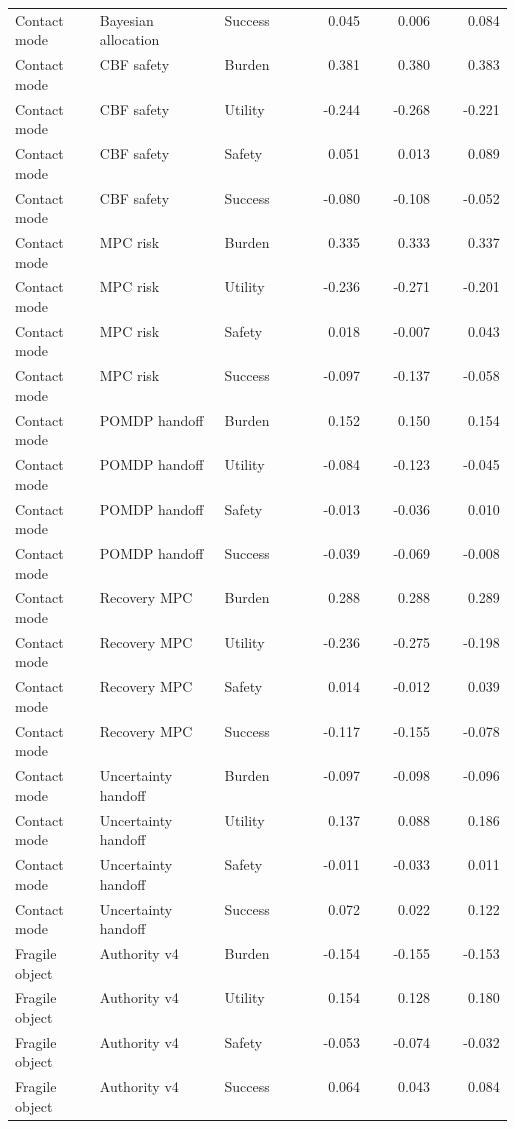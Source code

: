 \documentclass{article}
\begin{document}
\begin{center}
\begin{longtable}{p{0.17\linewidth}p{0.25\linewidth}p{0.16\linewidth}rrr}
Contact mode & Bayesian allocation & Success & 0.045 & 0.006 & 0.084\\
Contact mode & CBF safety & Burden & 0.381 & 0.380 & 0.383\\
Contact mode & CBF safety & Utility & -0.244 & -0.268 & -0.221\\
Contact mode & CBF safety & Safety & 0.051 & 0.013 & 0.089\\
Contact mode & CBF safety & Success & -0.080 & -0.108 & -0.052\\
Contact mode & MPC risk & Burden & 0.335 & 0.333 & 0.337\\
Contact mode & MPC risk & Utility & -0.236 & -0.271 & -0.201\\
Contact mode & MPC risk & Safety & 0.018 & -0.007 & 0.043\\
Contact mode & MPC risk & Success & -0.097 & -0.137 & -0.058\\
Contact mode & POMDP handoff & Burden & 0.152 & 0.150 & 0.154\\
Contact mode & POMDP handoff & Utility & -0.084 & -0.123 & -0.045\\
Contact mode & POMDP handoff & Safety & -0.013 & -0.036 & 0.010\\
Contact mode & POMDP handoff & Success & -0.039 & -0.069 & -0.008\\
Contact mode & Recovery MPC & Burden & 0.288 & 0.288 & 0.289\\
Contact mode & Recovery MPC & Utility & -0.236 & -0.275 & -0.198\\
Contact mode & Recovery MPC & Safety & 0.014 & -0.012 & 0.039\\
Contact mode & Recovery MPC & Success & -0.117 & -0.155 & -0.078\\
Contact mode & Uncertainty handoff & Burden & -0.097 & -0.098 & -0.096\\
Contact mode & Uncertainty handoff & Utility & 0.137 & 0.088 & 0.186\\
Contact mode & Uncertainty handoff & Safety & -0.011 & -0.033 & 0.011\\
Contact mode & Uncertainty handoff & Success & 0.072 & 0.022 & 0.122\\
Fragile object & Authority v4 & Burden & -0.154 & -0.155 & -0.153\\
Fragile object & Authority v4 & Utility & 0.154 & 0.128 & 0.180\\
Fragile object & Authority v4 & Safety & -0.053 & -0.074 & -0.032\\
Fragile object & Authority v4 & Success & 0.064 & 0.043 & 0.084\\

\end{longtable}
\end{center}
\end{document}
